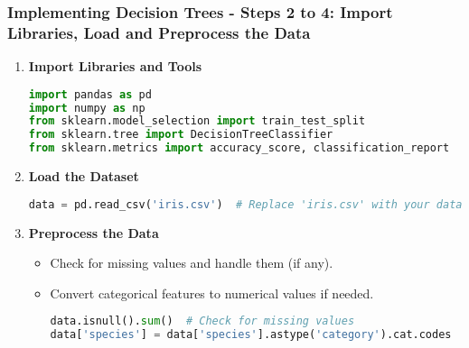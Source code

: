 \documentclass[aspectratio=169]{beamer}
\begin{document}
\begin{frame}[fragile]
    \frametitle{Implementing Decision Trees - Steps 2 to 4: Import Libraries, Load and Preprocess the Data}
    \begin{enumerate}
        \item \textbf{Import Libraries and Tools}
        \begin{lstlisting}[language=Python]
import pandas as pd
import numpy as np
from sklearn.model_selection import train_test_split
from sklearn.tree import DecisionTreeClassifier
from sklearn.metrics import accuracy_score, classification_report
        \end{lstlisting}

        \item \textbf{Load the Dataset}
        \begin{lstlisting}[language=Python]
data = pd.read_csv('iris.csv')  # Replace 'iris.csv' with your dataset path
        \end{lstlisting}
        
        \item \textbf{Preprocess the Data}
        \begin{itemize}
            \item Check for missing values and handle them (if any).
            \item Convert categorical features to numerical values if needed.
            \begin{lstlisting}[language=Python]
data.isnull().sum()  # Check for missing values
data['species'] = data['species'].astype('category').cat.codes  # Convert species to numeric
            \end{lstlisting}
        \end{itemize}
    \end{enumerate}
\end{frame}
\end{document}
